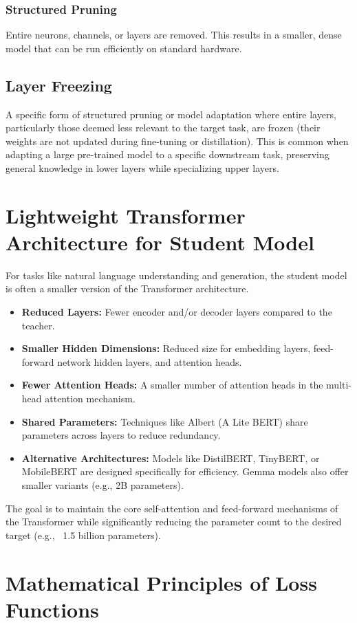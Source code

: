 \documentclass{article}
\begin{document}
\subsubsection{Structured Pruning}
Entire neurons, channels, or layers are removed. This results in a smaller, dense model that can be run efficiently on standard hardware.

\subsection{Layer Freezing}
A specific form of structured pruning or model adaptation where entire layers, particularly those deemed less relevant to the target task, are frozen (their weights are not updated during fine-tuning or distillation). This is common when adapting a large pre-trained model to a specific downstream task, preserving general knowledge in lower layers while specializing upper layers.

\section{Lightweight Transformer Architecture for Student Model}
For tasks like natural language understanding and generation, the student model is often a smaller version of the Transformer architecture.
\begin{itemize}
    \item \textbf{Reduced Layers:} Fewer encoder and/or decoder layers compared to the teacher.
    \item \textbf{Smaller Hidden Dimensions:} Reduced size for embedding layers, feed-forward network hidden layers, and attention heads.
    \item \textbf{Fewer Attention Heads:} A smaller number of attention heads in the multi-head attention mechanism.
    \item \textbf{Shared Parameters:} Techniques like Albert (A Lite BERT) share parameters across layers to reduce redundancy.
    \item \textbf{Alternative Architectures:} Models like DistilBERT, TinyBERT, or MobileBERT are designed specifically for efficiency. Gemma models also offer smaller variants (e.g., 2B parameters).
\end{itemize}
The goal is to maintain the core self-attention and feed-forward mechanisms of the Transformer while significantly reducing the parameter count to the desired target (e.g., ~1.5 billion parameters).

\section{Mathematical Principles of Loss Functions}
\end{document}
